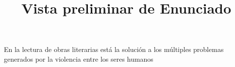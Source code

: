 \documentclass[a4paper,12pt]{article}\usepackage[utf8]{inputenc}\usepackage[spanish]{babel}\usepackage{times}
\title{Vista preliminar de Enunciado}
\begin{document}
\twocolumn 

\maketitle

En la lectura de obras literarias está la solución a los múltiples problemas generados por la violencia entre los seres humanos
\end{document}
